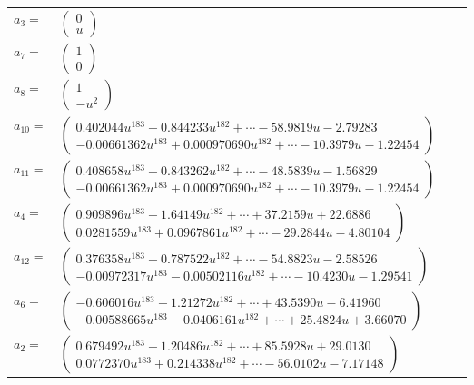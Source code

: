 \documentclass[1p]{elsarticle_modified}
\theoremstyle{definition}
\begin{document}
\begin{tabular}{m{7pt} m{180pt} m{7pt} m{180pt} }
\flushright $a_{3}=$&$\begin{pmatrix}0\\u\end{pmatrix}$ \\
\flushright $a_{7}=$&$\begin{pmatrix}1\\0\end{pmatrix}$ \\
\flushright $a_{8}=$&$\begin{pmatrix}1\\- u^2\end{pmatrix}$ \\
\flushright $a_{10}=$&$\begin{pmatrix}0.402044 u^{183}+0.844233 u^{182}+\cdots-58.9819 u-2.79283\\-0.00661362 u^{183}+0.000970690 u^{182}+\cdots-10.3979 u-1.22454\end{pmatrix}$ \\
\flushright $a_{11}=$&$\begin{pmatrix}0.408658 u^{183}+0.843262 u^{182}+\cdots-48.5839 u-1.56829\\-0.00661362 u^{183}+0.000970690 u^{182}+\cdots-10.3979 u-1.22454\end{pmatrix}$ \\
\flushright $a_{4}=$&$\begin{pmatrix}0.909896 u^{183}+1.64149 u^{182}+\cdots+37.2159 u+22.6886\\0.0281559 u^{183}+0.0967861 u^{182}+\cdots-29.2844 u-4.80104\end{pmatrix}$ \\
\flushright $a_{12}=$&$\begin{pmatrix}0.376358 u^{183}+0.787522 u^{182}+\cdots-54.8823 u-2.58526\\-0.00972317 u^{183}-0.00502116 u^{182}+\cdots-10.4230 u-1.29541\end{pmatrix}$ \\
\flushright $a_{6}=$&$\begin{pmatrix}-0.606016 u^{183}-1.21272 u^{182}+\cdots+43.5390 u-6.41960\\-0.00588665 u^{183}-0.0406161 u^{182}+\cdots+25.4824 u+3.66070\end{pmatrix}$ \\
\flushright $a_{2}=$&$\begin{pmatrix}0.679492 u^{183}+1.20486 u^{182}+\cdots+85.5928 u+29.0130\\0.0772370 u^{183}+0.214338 u^{182}+\cdots-56.0102 u-7.17148\end{pmatrix}$ \\

\end{tabular}
\end{document}
